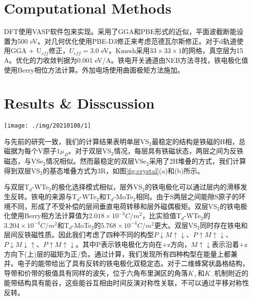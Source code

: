 \documentclass[reprint, aps, prb, showkeys]{revtex4-2}
\begin{document}
\section{Computational Methods}
DFT使用VASP软件包来实现。采用了GGA和PBE形式的近似，平面波截断能设置为500 eV。对几何优化使用PBE-D3修正来考虑范德瓦尔斯修正。对于d轨道使用GGA + U$_{eff}$修正，$U_{eff} = 3.0$ eV。Kmesh采用$33 \times 33 \times 1$的网格，真空层为15 A。优化的力收敛判据为0.001 eV/A。铁电开关通道由NEB方法寻找，铁电极化值使用Berry相位方法计算。外加电场使用曲面极矩方法施加。

\section{Results \& Disscussion}
\begin{figure*}[t]
    \texttt{[image: ./img/20210108/1]}
    \caption{\label{fig:crystal} 
    (a)-(b)VS$_2$晶格结构侧视图，铁电极化是反平行的，且平行于z轴正方向。灰色和红色代表上层和下层V原子。考虑SOC的铁电反铁磁构型$P{\downarrow}M{\uparrow\downarrow}$和$P{\uparrow}M{\uparrow\downarrow}$如(c)所示。第一布里渊区的Berry曲率分布如图(d)所示；考虑SOC的构型$P{\downarrow}M{\downarrow\uparrow}$和$P{\uparrow}M{\uparrow\downarrow}$如图(e)所示；对应的曲率如图(f)所示；能带图中，红色(蓝色)线条表示spin up和spin down。
    }
\end{figure*}

与先前的研究一致，我们的计算结果表明单层VS$_2$最稳定的结构是铁磁的H相，总磁据为每个V原子$1 \mu_B$。对于双层VS$_2$情况，每层具有铁磁状态，两层之间为反铁磁态，与VSe$_2$情况相似。然而最稳定的双层VSe$_2$采用了2H堆叠的方式，我们计算得到双层VS$_2$的基态堆叠方式为3R，如图\ref{fig:crystal}(a)和(b)所示。

与双层T$_d$-WTe$_2$的极化选择模式相似，层外VS$_2$的铁电极化可以通过层内的滑移发生反转。铁电的来源与T$_d$-WTe$_2$和T$_d$-MoTe$_2$相同。由于S两层之间能隙S原子的环境不同，形成了不受补偿的层间垂直电荷转移和层外磁偶极矩。双层VS$_2$的铁电极化使用Berry相方法计算值为$2.018 \times 10 ^{-3} C/m^2$，比实验值T$_d$-WTe$_2$的$3.204 \times 10 ^{-4} C/m^2$和T$_d$-MoTe$_2$的$5.768 \times 10 ^{-4} C/m^2$更大。双层VS$_2$同时存在铁电和层间反铁磁性质。因此我们考虑了四种不同的构型$P{\downarrow}M{\uparrow\downarrow}$、$P{\uparrow}M{\uparrow\downarrow}$、$P{\downarrow}M{\downarrow\uparrow}$、$P{\uparrow}M{\uparrow\downarrow}$。其中P表示铁电极化方向在+z方向，$M{\uparrow\downarrow}$表示沿着+z方向下(上)层的磁矩为正/负。通过计算，我们发现所有四种构型在能量上都兼并。电子的能带给出了具有反转的铁电极化双稳定态。对于二维蜂窝状晶格结构，导带和价带的极值具有同样的波矢，位于六角布里渊区的角落$K_{+}$和$K_{-}$机制附近的能带结构具有能谷，这些能谷互相由时间反演对称性关联，不可以通过平移对称性反转。
\end{document}
